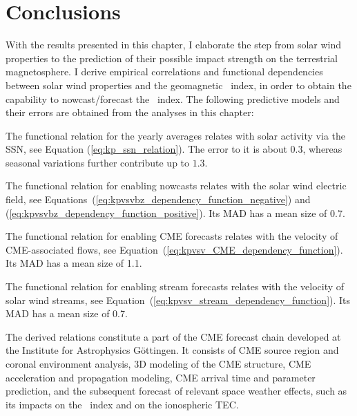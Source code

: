 

\section{Conclusions}
\label{sec:conclusions_ch2}
With the results presented in this chapter, I elaborate the step from solar wind properties to the prediction of their possible impact strength on the terrestrial magnetosphere. I derive empirical correlations and functional dependencies between solar wind properties and the geomagnetic \Kp~index, in order to obtain the capability to nowcast/forecast the \Kp~index. The following predictive models and their errors are obtained from the \Kp{} analyses in this chapter:
\begin{itemize*}
	\item The functional relation for the yearly \Kp{} averages relates \Kp{} with solar activity via the SSN, see Equation (\ref{eq:kp_ssn_relation}). The \Kp{} error to it is about $0.3$, whereas seasonal variations further contribute up to $1.3$.
	\item The functional relation for enabling \Kp{} nowcasts relates \Kp{} with the solar wind electric field, see Equations~(\ref{eq:kpvsvbz_dependency_function_negative}) and (\ref{eq:kpvsvbz_dependency_function_positive}). Its MAD has a mean \Kp{} size of \num{0.7}.
	\item The functional relation for enabling CME forecasts relates \Kp{} with the velocity of CME-associated flows, see Equation~(\ref{eq:kpvsv_CME_dependency_function}). Its MAD has a mean \Kp{} size of \num{1.1}.
	\item The functional relation for enabling stream forecasts relates \Kp{} with the velocity of solar wind streams, see Equation~(\ref{eq:kpvsv_stream_dependency_function}). Its MAD has a mean \Kp{} size of \num{0.7}.
\end{itemize*}

The derived \Kp{} relations constitute a part of the CME forecast chain developed at the Institute for Astrophysics Göttingen. It consists of CME source region and coronal environment analysis, 3D modeling of the CME structure, CME acceleration and propagation modeling, CME arrival time and parameter prediction, and the subsequent forecast of relevant space weather effects, such as its impacts on the \Kp~index and on the ionospheric TEC.

